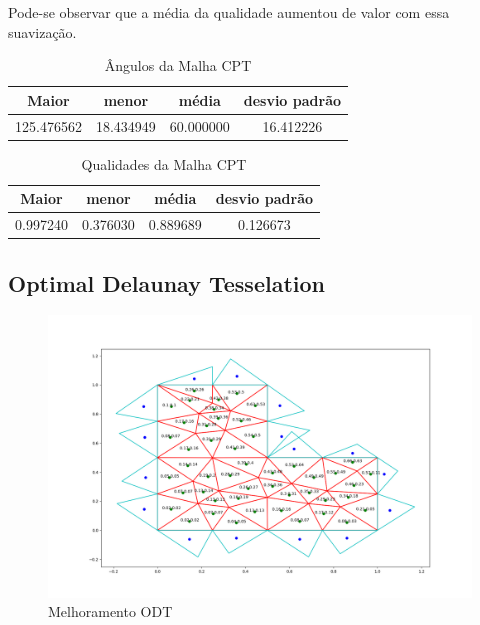 Pode-se observar que a média da qualidade aumentou de valor com essa suavização.

\begin{table}[hb]
\centering
\par\caption{Ângulos da Malha CPT}
\begin{tabular}{c|c|c|c}
Maior&menor&média&desvio padrão\\\hline\hline
125.476562&18.434949&60.000000&16.412226\\\hline
\end{tabular}
\label{tab:angulos-malha-cpt}
\end{table}

\begin{table}[hb]
\centering
\par\caption{Qualidades da Malha CPT}
\begin{tabular}{c|c|c|c}
Maior&menor&média&desvio padrão\\\hline\hline
0.997240&0.376030&0.889689&0.126673\\\hline
\end{tabular}
\label{tab:qualidades-malha-cpt}
\end{table}

\newpage
\subsection{Optimal Delaunay Tesselation}

\begin{figure}[ht]
    \centering
    \includegraphics[width=1\linewidth]{fig/malha-odt.png}
    \caption{Melhoramento ODT}
    \label{fig:malha-odt}
\end{figure}

